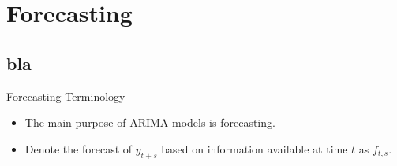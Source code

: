 \section{Forecasting}\subsection*{bla}
\begin{frame}{Forecasting Terminology}
\begin{itemize}
\item The main purpose of ARIMA models is forecasting.
\item Denote the forecast of $y_{t+s}$ based on information available at time $t$ as
$f_{t,s}$.




%
%




\end{itemize}
\end{frame}
